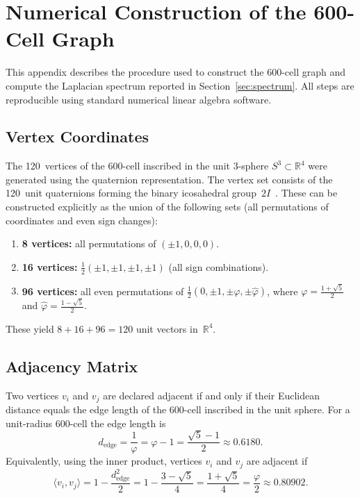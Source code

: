 \documentclass[12pt,a4paper]{article}
\newcommand{\vphi}{\varphi}
\newcommand{\R}{\mathbb{R}}
\begin{document}
\section{Numerical Construction of the 600-Cell Graph}
\label{app:construction}

This appendix describes the procedure used to construct the 600-cell graph and
compute the Laplacian spectrum reported in Section~\ref{sec:spectrum}.  All
steps are reproducible using standard numerical linear algebra software.

\subsection{Vertex Coordinates}

The 120~vertices of the 600-cell inscribed in the unit 3-sphere
$S^3 \subset \R^4$ were generated using the quaternion representation.  The
vertex set consists of the 120~unit quaternions forming the binary icosahedral
group~$2I$~\cite{conway2003}.  These can be constructed explicitly as the
union of the following sets (all permutations of coordinates and even sign
changes):

\begin{enumerate}[nosep]
  \item \textbf{8 vertices:} all permutations of $({\pm}1, 0, 0, 0)$.
  \item \textbf{16 vertices:} $\tfrac{1}{2}({\pm}1, {\pm}1, {\pm}1, {\pm}1)$
    (all sign combinations).
  \item \textbf{96 vertices:} all even permutations of
    $\tfrac{1}{2}(0, {\pm}1, {\pm}\vphi, {\pm}\hat\vphi)$,
    where $\vphi = \tfrac{1+\sqrt{5}}{2}$ and
    $\hat\vphi = \tfrac{1-\sqrt{5}}{2}$.
\end{enumerate}

\noindent These yield $8 + 16 + 96 = 120$ unit vectors in~$\R^4$.

\subsection{Adjacency Matrix}

Two vertices $v_i$ and $v_j$ are declared adjacent if and only if their
Euclidean distance equals the edge length of the 600-cell inscribed in the
unit sphere.  For a unit-radius 600-cell the edge length is
\begin{equation}\label{eq:edge_length}
  d_{\text{edge}} = \frac{1}{\vphi} = \vphi - 1 = \frac{\sqrt{5}-1}{2}
  \approx 0.6180.
\end{equation}
Equivalently, using the inner product, vertices $v_i$ and $v_j$ are adjacent
if
\begin{equation}\label{eq:adjacency_criterion}
  \langle v_i, v_j \rangle
  = 1 - \frac{d_{\text{edge}}^2}{2}
  = 1 - \frac{3 - \sqrt{5}}{4}
  = \frac{1 + \sqrt{5}}{4}
  = \frac{\vphi}{2}
  \approx 0.80902.
\end{equation}
\end{document}
